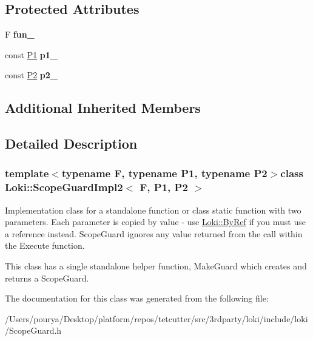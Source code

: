 \subsection*{Protected Attributes}
\begin{DoxyCompactItemize}
\item 
\hypertarget{classLoki_1_1ScopeGuardImpl2_a51dadd1231e39f644956d4699030a59f}{}F {\bfseries fun\+\_\+}\label{classLoki_1_1ScopeGuardImpl2_a51dadd1231e39f644956d4699030a59f}

\item 
\hypertarget{classLoki_1_1ScopeGuardImpl2_a26ae5a824df3dbc7d3a6549a7849dc3d}{}const \hyperlink{structP1}{P1} {\bfseries p1\+\_\+}\label{classLoki_1_1ScopeGuardImpl2_a26ae5a824df3dbc7d3a6549a7849dc3d}

\item 
\hypertarget{classLoki_1_1ScopeGuardImpl2_a5b851ac02d536c37a161c718060a234f}{}const \hyperlink{structP2}{P2} {\bfseries p2\+\_\+}\label{classLoki_1_1ScopeGuardImpl2_a5b851ac02d536c37a161c718060a234f}

\end{DoxyCompactItemize}
\subsection*{Additional Inherited Members}


\subsection{Detailed Description}
\subsubsection*{template$<$typename F, typename P1, typename P2$>$class Loki\+::\+Scope\+Guard\+Impl2$<$ F, P1, P2 $>$}

Implementation class for a standalone function or class static function with two parameters. Each parameter is copied by value -\/ use \hyperlink{group__ExceptionGroup_ga0a94ba0342e6abcdb8f9b32ed5ad7e3d}{Loki\+::\+By\+Ref} if you must use a reference instead. Scope\+Guard ignores any value returned from the call within the Execute function.

This class has a single standalone helper function, Make\+Guard which creates and returns a Scope\+Guard. 

The documentation for this class was generated from the following file\+:\begin{DoxyCompactItemize}
\item 
/\+Users/pourya/\+Desktop/platform/repos/tetcutter/src/3rdparty/loki/include/loki/Scope\+Guard.\+h\end{DoxyCompactItemize}
